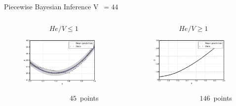 \documentclass[10pt]{beamer}
\begin{document}
\begin{frame}{Piecewise Bayesian Inference V~$= 44$}
  	\begin{columns}[onlytextwith]
    	\begin{column}{0.5\textwidth}
    	$$He/V \leq 1$$
      		\begin{figure}
        		\includegraphics[width=0.9\textwidth]{low44Result}
      		\end{figure}
      		~~~~~~~~~~~~~~~~~~~$45$~points
    	\end{column}  
    	\begin{column}{0.5\textwidth}
    	$$He/V \geq 1$$
      		\begin{figure}
        		\includegraphics[width=0.9\textwidth]{high44Result}
      		\end{figure}
      		~~~~~~~~~~~~~~~~~~~$146$~points
    	\end{column}
  	\end{columns}
\end{frame}
\end{document}
